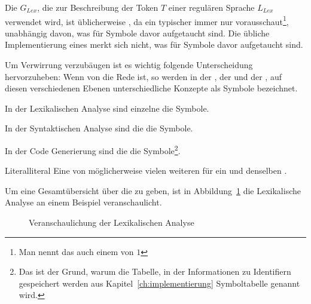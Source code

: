   Die  $G_{Lex}$, die zur Beschreibung der Token $T$ einer regulären Sprache $L_{Lex}$ verwendet wird, ist üblicherweise , da ein typischer  immer nur  vorausschaut\footnote{Man nennt das auch einem  von $1$}, unabhängig davon, was für Symbole davor aufgetaucht sind. Die übliche Implementierung eines  merkt sich nicht, was für Symbole davor aufgetaucht sind.


\begin{Special_Paragraph}
  Um Verwirrung verzubäugen ist es wichtig folgende Unterscheidung hervorzuheben: Wenn von  die Rede ist, so werden in der , der  und der , auf diesen verschiedenen Ebenen unterschiedliche Konzepte als Symbole bezeichnet.

  In der Lexikalischen Analyse sind einzelne  die Symbole.

  In der Syntaktischen Analyse sind die  die Symbole.

  In der Code Generierung sind die  die Symbole\footnote{Das ist der Grund, warum die Tabelle, in der Informationen zu Identifiern gespeichert werden aus Kapitel~\ref{ch:implementierung} Symboltabelle genannt wird.}.
\end{Special_Paragraph}

\begin{Definition}{Literal}{literal}
  Eine von möglicherweise vielen weiteren  für ein und denselben .
\end{Definition}

Um eine Gesamtübersicht über die  zu geben, ist in Abbildung~\ref{fig:lexikalische_analyse_veranschaulichung} die Lexikalische Analyse an einem Beispiel veranschaulicht.

\begin{figure}[H]
  \hfill

  \caption{Veranschaulichung der Lexikalischen Analyse}
  \label{fig:lexikalische_analyse_veranschaulichung}
\end{figure}

